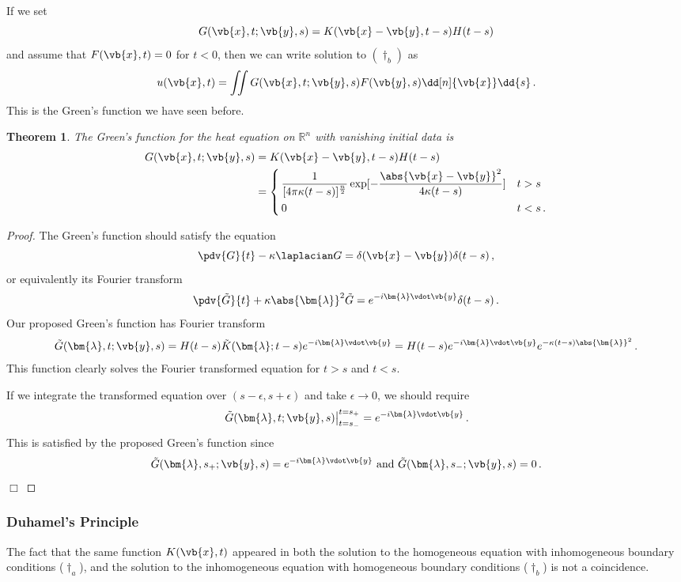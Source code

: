 \documentclass{article}
\theoremstyle{plain}\theoremheaderfont{\normalfont\itshape}\theorembodyfont{\rmfamily}\theoremseparator{.}\newtheorem*{rem}{Remark}\newtheorem*{ex}{Example}\newtheorem*{proof}{Proof}\newtheorem*{altp}{Alternative proof}
\theoremstyle{plain}\theoremheaderfont{\normalfont\bfseries}\theorembodyfont{\rmfamily}\theoremseparator{.}\newtheorem{thm}{Theorem}[section]\newtheorem{lem}[thm]{Lemma}\newtheorem{prop}[thm]{Proposition}\newtheorem*{cor}{Corollary}\newtheorem{defn}[thm]{Definition}\newtheorem{clm}[thm]{Claim}\newtheorem{clminproof}{Claim}
\theoremstyle{break}\theoremheaderfont{\normalfont\itshape}\theorembodyfont{\rmfamily}\theoremseparator{.\medskip}\newtheorem*{proofskip}{Proof}\newtheorem*{exs}{Examples}\newtheorem*{rems}{Remarks}
\theoremstyle{break}\theoremheaderfont{\normalfont\bfseries}\theorembodyfont{\rmfamily}\theoremseparator{.\medskip}\newtheorem{lemskip}[thm]{Lemma}\newtheorem{defnskip}[thm]{Definition}\newtheorem{propskip}[thm]{Proposition}\newtheorem{thmskip}[thm]{Theorem}
\numberwithin{equation}{section}
\newcommand{\qed}{\hfill\ensuremath{\Box}}
\newcommand{\bl}{\bm{\lambda}}
\begin{document}
	If we set
	\[G(\vb{x},t;\vb{y},s)=K(\vb{x}-\vb{y},t-s)H(t-s)\]
	and assume that \(F(\vb{x},t)=0\) for \(t<0\), then we can write solution to \((\dagger_b)\) as
	\[u(\vb{x},t)=\iint G(\vb{x},t;\vb{y},s)F(\vb{y},s)\dd[n]{\vb{x}}\dd{s}\,.\]
	This is the Green's function we have seen before.
	\begin{thm}
		The Green's function for the heat equation on \(\mathbb{R}^n\) with vanishing initial data is
		\begin{align*}
			G(\vb{x},t;\vb{y},s)&=K(\vb{x}-\vb{y},t-s)H(t-s)\\
			&=\left\{\begin{aligned}
				&\,\frac{1}{[4\pi\kappa(t-s)]^\frac{n}{2}}\exp[-\frac{\abs{\vb{x}-\vb{y}}^2}{4\kappa (t-s)}] && t>s\\
				&\,0 && t<s\,.
			\end{aligned}\right.
		\end{align*}
	\end{thm}
	\begin{proof}
		The Green's function should satisfy the equation
		\[\pdv{G}{t}-\kappa\laplacian G=\delta(\vb{x}-\vb{y})\delta(t-s)\,,\]
		or equivalently its Fourier transform
		\[\pdv{\tilde{G}}{t}+\kappa\abs{\bl}^2\tilde{G}=e^{-i\bl\vdot\vb{y}}\delta(t-s)\,.\]
		Our proposed Green's function has Fourier transform
		\[\tilde{G}(\bl,t;\vb{y},s)=H(t-s)\tilde{K}(\bl;t-s)e^{-i\bl\vdot\vb{y}}=H(t-s)e^{-i\bl\vdot\vb{y}}e^{-\kappa(t-s)\abs{\bl}^2}\,.\]
		This function clearly solves the Fourier transformed equation for \(t>s\) and \(t<s\).

		If we integrate the transformed equation over \((s-\epsilon,s+\epsilon)\) and take \(\epsilon\to 0\), we should require
		\[\left.\tilde{G}(\bl,t;\vb{y},s)\right|_{t=s_-}^{t=s_+}=e^{-i\bl\vdot\vb{y}}\,.\]
		This is satisfied by the proposed Green's function since
		\[\tilde{G}(\bl,s_+;\vb{y},s)=e^{-i\bl\vdot\vb{y}}\text{ and }\tilde{G}(\bl,s_-;\vb{y},s)=0\,.\]\qed
	\end{proof}
	\subsubsection{Duhamel's Principle}
	The fact that the same function \(K(\vb{x},t)\) appeared in both the solution to the homogeneous equation with inhomogeneous boundary conditions (\(\dagger_a\)), and the solution to the inhomogeneous equation with homogeneous boundary conditions (\(\dagger_b\)) is not a coincidence.
\end{document}
